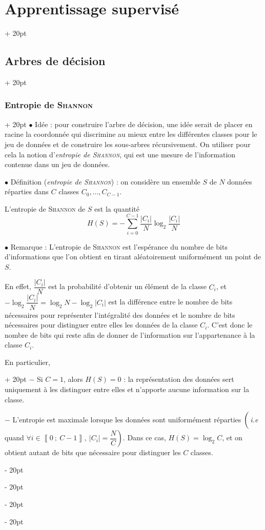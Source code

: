 \documentclass[a4paper, 12pt, twoside]{article}
\newcommand{\nset}[2]{\left\llbracket #1\ ;\ #2 \right\rrbracket}
\newcommand{\abs}[1]{\left\lvert #1 \right\rvert}
\newcommand{\ind}[1][20pt]{\advance\leftskip + #1}
\newcommand{\deind}[1][20pt]{\advance\leftskip - #1}
\newenvironment{indt}[2][20pt]{#2 \par \ind[#1]}{\par \deind} %
\begin{document}
\begin{indt}{\section{Apprentissage supervisé}}
\begin{indt}{\subsection{Arbres de décision}}
            \begin{indt}{\subsubsection{Entropie de \textsc{Shannon}}}
                $\bullet$ Idée : pour construire l'arbre de décision, une idée serait de placer en racine la coordonnée qui discrimine au mieux entre les différentes classes pour le jeu de données et de construire les sous-arbres récursivement.
                On utiliser pour cela la notion d'\emph{entropie de \textsc{Shannon}}, qui est une mesure de l'information contenue dans un jeu de données.

                \vspace{12pt}
                
                $\bullet$ Définition (\textit{entropie de \textsc{Shannon}}) :
                on considère un ensemble $S$ de $N$ données réparties dans $C$ classes $C_0, \ldots, C_{C - 1}$.

                L'entropie de \textsc{Shannon} de $S$ est la quantité
                \[
                    H(S) = -\sum_{i = 0}^{C - 1} \dfrac{\abs{C_i}}{N} \log_2 \dfrac{\abs{C_i}}{N}
                \]

                \vspace{12pt}
                
                $\bullet$ Remarque : L'entropie de \textsc{Shannon} est l'espérance du nombre de bits d'informations que l'on obtient en tirant aléatoirement uniformément un point de $S$.

                En effet, $\dfrac{\abs{C_i}} N$ est la probabilité d'obtenir un élément de la classe $C_i$, et $-\log_2 \dfrac{\abs{C_i}}N = \log_2 N - \log_2 \abs{C_i}$ est la différence entre le nombre de bits nécessaires pour représenter l'intégralité des données et le nombre de bits nécessaires pour distinguer entre elles les données de la classe $C_i$.
                C'est donc le nombre de bits qui reste afin de donner de l'information sur l'appartenance à la classe $C_i$.

                \begin{indt}{En particulier,}
                    $-$ Si $C = 1$, alors $H(S) = 0$ : la représentation des données sert uniquement à les distinguer entre elles et n'apporte aucune information sur la classe.
                    
                    $-$ L'entropie est maximale lorsque les données sont uniformément réparties $\left(\vphantom{\dfrac N C} \right.$\textit{i.e} quand $\left. \forall i \in \nset 0 {C - 1},\ \abs{C_i} = \dfrac N C \right)$.
                    Dans ce cas, $H(S) = \log_2 C$, et on obtient autant de bits que nécessaire pour distinguer les $C$ classes.
                \end{indt}


\end{indt}
\end{indt}
\end{indt}
\end{document}
